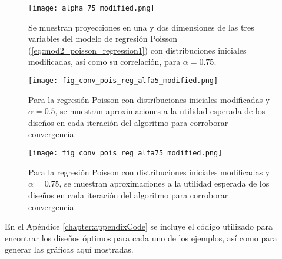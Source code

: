 \begin{figure}[h]
	\centering
    \texttt{[image: alpha\_75\_modified.png]}
    \caption{Se muestran proyecciones en una y dos dimensiones de las tres variables del modelo de regresión Poisson (\ref{eq:mod2_poisson_regression1}) con distribuciones iniciales modificadas, así como su correlación, para $\alpha=0.75$.}
    \label{fig:pois_reg75_modified}
\end{figure}








\begin{figure}[h]
	\centering
    \texttt{[image: fig\_conv\_pois\_reg\_alfa5\_modified.png]}
    \caption{Para la regresión Poisson con distribuciones iniciales modificadas y $\alpha = 0.5$, se muestran aproximaciones a la utilidad esperada de los diseños en cada iteración del algoritmo para corroborar convergencia.}
    \label{fig:pois_reg_conv_alfa5_modified}
\end{figure}



\begin{figure}[h]
	\centering
    \texttt{[image: fig\_conv\_pois\_reg\_alfa75\_modified.png]}
    \caption{Para la regresión Poisson con distribuciones iniciales modificadas y $\alpha = 0.75$, se muestran aproximaciones a la utilidad esperada de los diseños en cada iteración del algoritmo para corroborar convergencia.}
    \label{fig:pois_reg_conv_alfa75_modified}
\end{figure}




\FloatBarrier






En el Apéndice \ref{chapter:appendixCode} se incluye el código utilizado para encontrar los diseños óptimos para cada uno de los ejemplos, así como para generar las gráficas aquí mostradas.












